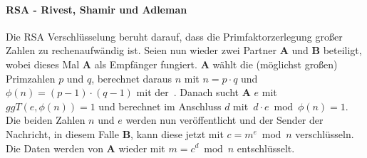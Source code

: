 		\paragraph{RSA - Rivest, Shamir und Adleman}\label{p:rsa}
			Die RSA Verschlüsselung beruht darauf,
			dass die Primfaktorzerlegung großer Zahlen zu rechenaufwändig ist.
			Seien nun wieder zwei Partner \textbf{A} und \textbf{B} beteiligt,
			wobei dieses Mal \textbf{A} als Empfänger fungiert.
			\textbf{A} wählt die (möglichst großen) Primzahlen $p$ und $q$,
			berechnet daraus $n$ mit $n=p\cdot q$ und $\phi(n) = (p-1)\cdot (q-1)$
			mit der~.
			Danach sucht \textbf{A} $e$ mit $ggT(e, \phi(n)) = 1$ und
			berechnet im Anschluss $d$ mit~$d\cdot e\bmod \phi(n) = 1$.
			Die beiden Zahlen $n$ und $e$ werden nun veröffentlicht und
			der Sender der Nachricht, in diesem Falle \textbf{B},
			kann diese jetzt mit $c = m^{e}\bmod n$ verschlüsseln.
			Die Daten werden von \textbf{A} wieder mit $m = c^{d}\bmod n$ entschlüsselt.